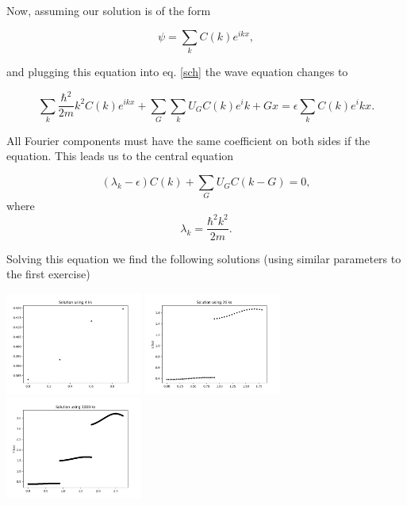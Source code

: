 \begin{questions}
\begin{solution}
Now, assuming our solution is of the form

\begin{equation}
  \psi = \sum_k C(k)e^{ikx},
\end{equation}

and plugging this equation into eq. \ref{sch} the wave equation changes to

\begin{equation}
  \sum_k \frac{\hbar^2}{2m}k^2 C(k)e^{ikx} + \sum_G \sum_k U_GC(k)e^i{k+G}x = \epsilon \sum_k C(k)e^ikx.
\end{equation}

All Fourier components must have the same coefficient on both sides if the equation. This leads us to the central equation

\begin{equation}
  (\lambda_k -\epsilon)C(k) + \sum_G U_GC(k-G) = 0,
  \label{central}
\end{equation}
where
\begin{equation}
  \lambda_k = \frac{\hbar^2 k^2}{2m}.
\end{equation}

Solving this equation we find the following solutions (using similar parameters to the first exercise)
%
\begin{center}
  \includegraphics[width=45mm]{num4}
  \includegraphics[width=45mm]{num20}
  \includegraphics[width=45mm]{num1000}
\end{center}


\end{solution}
\end{questions}
